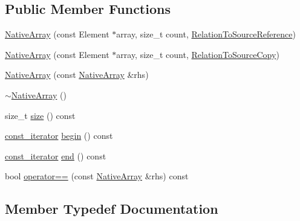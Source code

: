 \subsection*{Public Member Functions}
\begin{DoxyCompactItemize}
\item 
\mbox{\hyperlink{classtesting_1_1internal_1_1_native_array_a52b3689c62532703d11e9d82939a7141}{Native\+Array}} (const Element $\ast$array, size\+\_\+t count, \mbox{\hyperlink{structtesting_1_1internal_1_1_relation_to_source_reference}{Relation\+To\+Source\+Reference}})
\item 
\mbox{\hyperlink{classtesting_1_1internal_1_1_native_array_ac184ee5741af5be3402213819c834405}{Native\+Array}} (const Element $\ast$array, size\+\_\+t count, \mbox{\hyperlink{structtesting_1_1internal_1_1_relation_to_source_copy}{Relation\+To\+Source\+Copy}})
\item 
\mbox{\hyperlink{classtesting_1_1internal_1_1_native_array_abb346ac3040f5da733f594cc2d5958bc}{Native\+Array}} (const \mbox{\hyperlink{classtesting_1_1internal_1_1_native_array}{Native\+Array}} \&rhs)
\item 
\mbox{\hyperlink{classtesting_1_1internal_1_1_native_array_a55ab5948d473a487303dcf6e02ad1f60}{$\sim$\+Native\+Array}} ()
\item 
size\+\_\+t \mbox{\hyperlink{classtesting_1_1internal_1_1_native_array_af96a4a5ca0cdd5d163c47a081f08bd89}{size}} () const
\item 
\mbox{\hyperlink{classtesting_1_1internal_1_1_native_array_a9ce7c8408460d7158a2870456d134557}{const\+\_\+iterator}} \mbox{\hyperlink{classtesting_1_1internal_1_1_native_array_a3046d93cfa23097e7b7c91f5f982dc78}{begin}} () const
\item 
\mbox{\hyperlink{classtesting_1_1internal_1_1_native_array_a9ce7c8408460d7158a2870456d134557}{const\+\_\+iterator}} \mbox{\hyperlink{classtesting_1_1internal_1_1_native_array_ae1cda748e49c6906421c6183c4d07c5a}{end}} () const
\item 
bool \mbox{\hyperlink{classtesting_1_1internal_1_1_native_array_a81b90f5739ed812610e68dc34c9e3850}{operator==}} (const \mbox{\hyperlink{classtesting_1_1internal_1_1_native_array}{Native\+Array}} \&rhs) const
\end{DoxyCompactItemize}


\subsection{Member Typedef Documentation}
\mbox{\label{classtesting_1_1internal_1_1_native_array_a9ce7c8408460d7158a2870456d134557}} 
